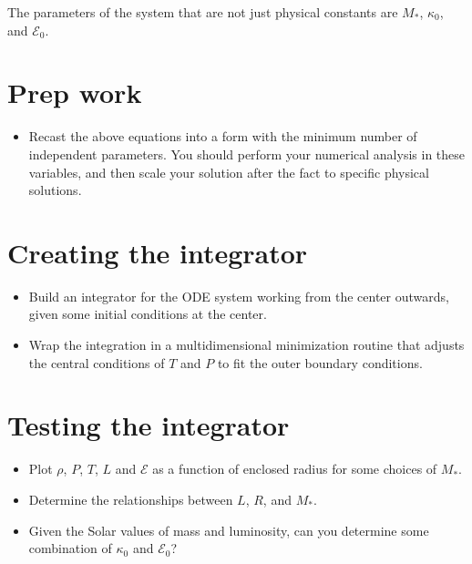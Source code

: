\documentclass[11pt, preprint]{aastex}
\begin{document}
The parameters of the system that are not just physical constants are
$M_\ast$, $\kappa_0$,  and $\mathcal{E}_0$.

\section{Prep work}

\begin{itemize}
\item Recast the above equations into a form with the minimum number
  of independent parameters.  You should perform your numerical
  analysis in these variables, and then scale your solution after the
  fact to specific physical solutions.
\end{itemize}

\section{Creating the integrator}

\begin{itemize}
\item Build an integrator for the ODE system working from the center
  outwards, given some initial conditions at the center.
\item Wrap the integration in a multidimensional minimization routine
  that adjusts the central conditions of $T$ and $P$ to fit the outer
  boundary conditions.
\end{itemize}

\section{Testing the integrator}

\begin{itemize}
\item Plot $\rho$, $P$, $T$, $L$ and $\mathcal{E}$ as a function of
  enclosed radius for some choices of $M_\ast$.
\item Determine the relationships between $L$, $R$, and $M_\ast$.
\item Given the Solar values of mass and luminosity, can you determine
  some combination of $\kappa_0$ and $\mathcal{E}_0$?
\end{itemize}
\end{document}
